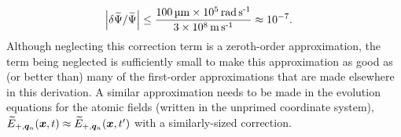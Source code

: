 \begin{align}
    \abs{\delta \widetilde{\Psi} / \widetilde{\Psi}} &\leq \frac{\unit[100]{\micro m} \times \unit[10^{5}]{rad\,s\textsuperscript{-1}}}{3 \times \unit[10^8]{m\,s\textsuperscript{-1}}} \approx 10^{-7}.
\end{align}
Although neglecting this correction term is a zeroth-order approximation, the term being neglected is sufficiently small to make this approximation as good as (or better than) many of the first-order approximations that are made elsewhere in this derivation.  A similar approximation needs to be made in the evolution equations for the atomic fields (written in the unprimed coordinate system), $\widetilde{E}_{+, \bm{q}_n}(\bm{x}, t) \approx \widetilde{E}_{+, \bm{q}_n}(\bm{x}, t')$ with a similarly-sized correction.  

